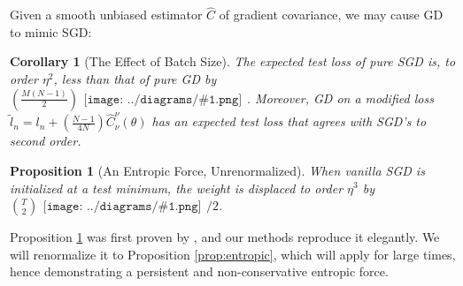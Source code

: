 \documentclass{article}
\newtheorem{cor}{Corollary}
\newtheorem{prop}{Proposition}
\newcommand{\wrap}[1]{\left(#1\right)}
\newcommand{\sdia}[1]{\begin{gathered}\texttt{[image: ../diagrams/\#1.png]}\end{gathered}}
\begin{document}
        Given a smooth unbiased estimator $\hat{C}$ of gradient covariance, we
        may cause GD to mimic SGD:
        \begin{cor}[The Effect of Batch Size] \label{cor:batch}
            The expected test loss of pure SGD is, to order $\eta^2$,
            less than that of pure GD by
            $
                  \wrap{\frac{M(N-1)}{2}} \sdia{c(01-2)(01-12)}
            $.
            Moreover, GD on a modified loss 
            $
                \tilde l_n = l_n + \wrap{\frac{N-1}{4N}} \hat{C}_\nu^\nu(\theta)
            $
            has an expected test loss that agrees with SGD's to second order.
        \end{cor}
    
        \begin{prop}[An Entropic Force, Unrenormalized] \label{prop:noncons}
            When vanilla SGD is initialized at a test minimum, the weight is
            displaced to order $\eta^3$ by 
            $
                {T \choose 2} \sdia{c(01-2-3)(02-12-23)} / 2
            $.
        \end{prop}
        Proposition \ref{prop:noncons} was first proven by \citet{ya19b}, and
        our methods reproduce it elegantly.  We will renormalize it to
        Proposition \ref{prop:entropic}, which will apply for large times, 
        hence demonstrating a persistent and non-conservative entropic force.
    
\end{document}
